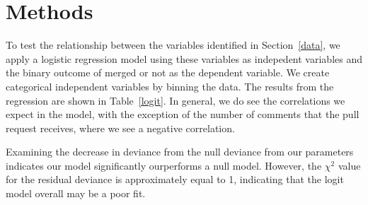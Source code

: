 \documentclass[12pt]{article}
\begin{document}
\section{Methods}\label{methods}
To test the relationship between the variables identified in Section~\ref{data},
we apply a logistic regression model using these variables as indepedent
variables and the binary outcome of merged or not as the dependent variable. We
create categorical independent variables by binning the data. The results from
the regression are shown in Table~\ref{logit}. In general, we do see the
correlations we expect in the model, with the exception of the number of
comments that the pull request receives, where we see a negative correlation. 

Examining the decrease in deviance from the null deviance from our parameters
indicates our model significantly ourperforms a null model. However, the
$\chi^{2}$ value for the residual deviance is approximately equal to 1,
indicating that the logit model overall may be a poor fit.
\end{document}
